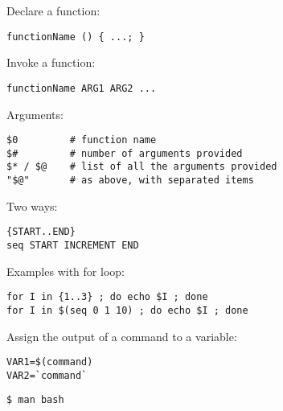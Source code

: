 \documentclass[twocolumn,8pt]{article}
\begin{document}

\begin{mdframed}[frametitle=Functions]
Declare a function:
\begin{lstlisting}
functionName () { ...; }
\end{lstlisting}

Invoke a function:
\begin{lstlisting}
functionName ARG1 ARG2 ...
\end{lstlisting}

Arguments:
\begin{lstlisting}
$0         # function name
$#         # number of arguments provided
$* / $@    # list of all the arguments provided
"$@"       # as above, with separated items
\end{lstlisting}
\end{mdframed}



\begin{mdframed}[frametitle=Ranges]
Two ways:
\begin{lstlisting}
{START..END}
seq START INCREMENT END
\end{lstlisting}

Examples with for loop:
\begin{lstlisting}
for I in {1..3} ; do echo $I ; done
for I in $(seq 0 1 10) ; do echo $I ; done
\end{lstlisting}
\end{mdframed}



\begin{mdframed}[frametitle=Subshell]
Assign the output of a command to a variable:
\begin{lstlisting}
VAR1=$(command)
VAR2=`command`
\end{lstlisting}
\end{mdframed}



\begin{mdframed}[frametitle=Resources]
\begin{lstlisting}
$ man bash
\end{lstlisting}
\end{mdframed}    
\end{document}
